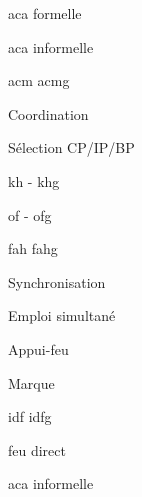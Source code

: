 \begin{e1}
\begin{e2}
\begin{e3}
			\begin{e4}
				\item \gls{aca} formelle
				\item \gls{aca} informelle
			\end{e4}
		\end{e3}
		\item {} \gls{acm}\eskip{} \glsdesc{acmg}
		\item Coordination
		\begin{e3}
			\item Sélection CP/IP/BP
			\item {} \gls{kh} - \glsdesc{khg}
			\item {} \gls{of} - \glsdesc{ofg}
			\item {} \gls{fah}\eskip{} \glsdesc{fahg}
		\end{e3}
		\item Synchronisation
		\begin{e3}
			\item Emploi simultané
			\item Appui-feu
			\begin{e4}
				\item Marque
				\begin{e5}
					\item {} \gls{idf} \glsdesc{idfg}
					\item feu direct
				\end{e5}
				\item \gls{aca} informelle
			\end{e4}
		\end{e3}		
	\end{e2}
\end{e1}